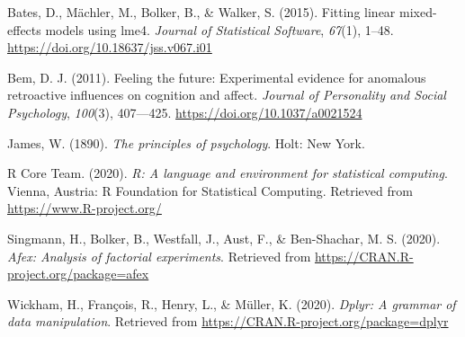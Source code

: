 \documentclass[
  english,
  man]{apa6}
\begin{document}
\leavevmode\hypertarget{ref-R-lme4}{}%
Bates, D., Mächler, M., Bolker, B., \& Walker, S. (2015). Fitting linear mixed-effects models using lme4. \emph{Journal of Statistical Software}, \emph{67}(1), 1--48. \url{https://doi.org/10.18637/jss.v067.i01}

\leavevmode\hypertarget{ref-bem_2011}{}%
Bem, D. J. (2011). Feeling the future: Experimental evidence for anomalous retroactive influences on cognition and affect. \emph{Journal of Personality and Social Psychology}, \emph{100}(3), 407---425. \url{https://doi.org/10.1037/a0021524}

\leavevmode\hypertarget{ref-james_1890}{}%
James, W. (1890). \emph{The principles of psychology}. Holt: New York.

\leavevmode\hypertarget{ref-R-base}{}%
R Core Team. (2020). \emph{R: A language and environment for statistical computing}. Vienna, Austria: R Foundation for Statistical Computing. Retrieved from \url{https://www.R-project.org/}

\leavevmode\hypertarget{ref-R-afex}{}%
Singmann, H., Bolker, B., Westfall, J., Aust, F., \& Ben-Shachar, M. S. (2020). \emph{Afex: Analysis of factorial experiments}. Retrieved from \url{https://CRAN.R-project.org/package=afex}

\leavevmode\hypertarget{ref-R-dplyr}{}%
Wickham, H., François, R., Henry, L., \& Müller, K. (2020). \emph{Dplyr: A grammar of data manipulation}. Retrieved from \url{https://CRAN.R-project.org/package=dplyr}
\end{document}
